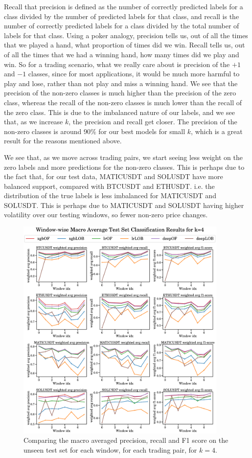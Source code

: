 Recall that precision is defined as the number of correctly predicted labels for a class divided by the number of predicted labels for that
class, and recall is the number of correctly predicted labels for a class divided by the total number of labels for that class.
Using a poker analogy, precision tells us, out of all the times that we played a hand, what proportion of times did we win. Recall
tells us, out of all the times that we had a winning hand, how many times did we play and win.
So for a trading scenario, what we really care about is precision of the $+1$ and $-1$ classes, since for most applications, it would
be much more harmful to play and lose, rather than not play and miss a winning hand.
We see that the precision of the non-zero classes is much higher than the precision of the zero class, whereas the recall of the
non-zero classes is much lower than the recall of the zero class. This is due to the imbalanced nature of our labels, and we
see that, as we increase $k$, the precision and recall get closer. The precision of the non-zero classes is around 90\% for our best models for
small $k$, which is a great result for the reasons mentioned above.

We see that, as we move across trading pairs, we start seeing less weight on the zero labels and more predictions
for the non-zero classes. This is perhaps due to the fact that, for our test data, MATICUSDT and SOLUSDT have more balanced support, compared with BTCUSDT and ETHUSDT. i.e. the distribution of the true labels is less imbalanced for MATICUSDT and SOLUSDT.
This is perhaps due to MATICUSDT and SOLUSDT having higher volatility over our testing windows, so fewer non-zero price changes.

\begin{figure}[htpb!]
    \centering
    \includegraphics[width=0.93\textwidth]{./images/macro_results_k=4.pdf}
    \caption{Comparing the macro averaged precision, recall and F1 score on the unseen test set for each window, for each trading pair, for $k=4$.}
    \label{macro_plots_1}
\end{figure}

